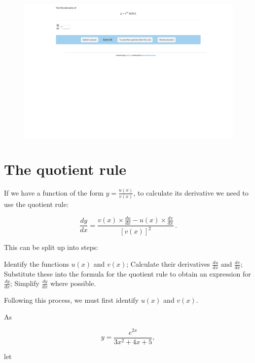 \documentclass[
  a4paper,
]{scrbook}
\begin{document}
\begin{figure}

{\centering 

\href{https://numbas.mathcentre.ac.uk/question/101423/differentiation-product-rule-6/embed/?token=95bdacf5-d008-407f-86b9-4605fa18c389}{\includegraphics{./12-further-differentiation_files/figure-pdf/unnamed-chunk-3-1.png}}

}

\end{figure}

\hypertarget{the-quotient-rule}{%
\section{The quotient rule}\label{the-quotient-rule}}

If we have a function of the form \(y=\tfrac{u(x)}{v(x)}\), to calculate
its derivative we need to use the quotient rule:

\[
\dfrac{dy}{dx} = \dfrac{v(x) \times \frac{du}{dx} - u(x) \times\frac{dv}{dx}}{[v(x)]^2}\,.
\]

This can be split up into steps:

Identify the functions \(u(x)\) and \(v(x)\); Calculate their
derivatives \(\tfrac{du}{dx}\) and \(\tfrac{dv}{dx}\); Substitute these
into the formula for the quotient rule to obtain an expression for
\(\tfrac{dy}{dx}\); Simplify \(\tfrac{dy}{dx}\) where possible.

Following this process, we must first identify \(u(x)\) and \(v(x)\).

As

\[
y=\frac{e^{2x}}{3x^2+4x+5},
\]

let
\end{document}
